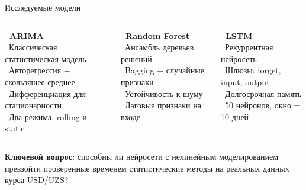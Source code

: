 \begin{frame}[shrink=10]{Исследуемые модели}

  \begin{columns}[T]
    \begin{tcolorbox}[infobox, equal height group=models]
      \textbf{\color{primary}\faChartLine\ ARIMA}\\[6pt]
      \small
      \textcolor{accent}{\faAngleRight}~Классическая статистическая модель\\[3pt]
      \textcolor{accent}{\faAngleRight}~Авторегрессия + скользящее среднее\\[3pt]
      \textcolor{accent}{\faAngleRight}~Дифференциация для стационарности\\[3pt]
      \textcolor{accent}{\faAngleRight}~Два режима: rolling и static
    \end{tcolorbox}

    \begin{tcolorbox}[infobox, equal height group=models]
      \textbf{\color{primary}\faTree\ Random Forest}\\[6pt]
      \small
      \textcolor{accent}{\faAngleRight}~Ансамбль деревьев решений\\[3pt]
      \textcolor{accent}{\faAngleRight}~Bagging + случайные признаки\\[3pt]
      \textcolor{accent}{\faAngleRight}~Устойчивость к шуму\\[3pt]
      \textcolor{accent}{\faAngleRight}~Лаговые признаки на входе
    \end{tcolorbox}

    \begin{tcolorbox}[infobox, equal height group=models]
      \textbf{\color{primary}\faBrain\ LSTM}\\[6pt]
      \small
      \textcolor{accent}{\faAngleRight}~Рекуррентная нейросеть\\[3pt]
      \textcolor{accent}{\faAngleRight}~Шлюзы: forget, input, output\\[3pt]
      \textcolor{accent}{\faAngleRight}~Долгосрочная память\\[3pt]
      \textcolor{accent}{\faAngleRight}~50 нейронов, окно = 10 дней
    \end{tcolorbox}
  \end{columns}

  \vspace{0.3cm}
  \begin{tcolorbox}[successbox]
    \small \textbf{Ключевой вопрос:} способны ли нейросети с нелинейным моделированием превзойти проверенные временем статистические методы на реальных данных курса USD/UZS?
  \end{tcolorbox}
\end{frame}
